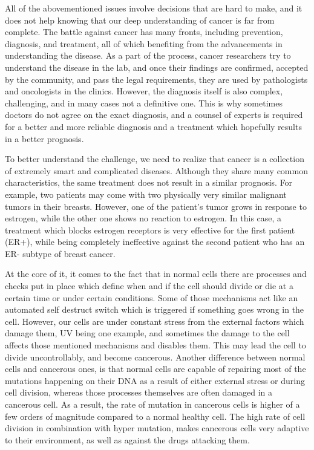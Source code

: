 All of the abovementioned issues involve decisions that are hard to make, and
it does not help knowing that our deep understanding of cancer is far from
complete. The battle against cancer has many fronts, including prevention,
diagnosis, and treatment, all of which benefiting from the advancements in
understanding the disease. As a part of the process, cancer researchers try to
understand the disease in the lab, and once their findings are confirmed,
accepted by the community, and pass the legal requirements, they are used by
pathologists and oncologists in the clinics. However, the diagnosis itself is
also complex, challenging, and in many cases not a definitive one. This is why
sometimes doctors do not agree on the exact diagnosis, and a counsel of experts
is required for a better and more reliable diagnosis and a treatment which
hopefully results in a better prognosis.

To better understand the challenge, we need to realize that cancer is a
collection of extremely smart and complicated diseases. Although they share
many common characteristics, the same treatment does not result in a similar
prognosis. For example, two patients may come with two physically very similar
malignant tumors in their breasts. However, one of the patient's tumor grows in
response to estrogen, while the other one shows no reaction to estrogen. In
this case, a treatment which blocks estrogen receptors is very effective for
the first patient (ER+), while being completely ineffective against the second
patient who has an ER- subtype of breast cancer.

At the core of it, it comes to the fact that in normal cells there are
processes and checks put in place which define when and if the cell should
divide or die at a certain time or under certain conditions. Some of those
mechanisms act like an automated self destruct switch which is triggered if
something goes wrong in the cell. However, our cells are under constant stress
from the external factors which damage them, UV being one example, and
sometimes the damage to the cell affects those mentioned mechanisms and
disables them. This may lead the cell to divide uncontrollably, and become
cancerous. Another difference between normal cells and cancerous ones, is that
normal cells are capable of repairing most of the mutations happening on their
DNA as a result of either external stress or during cell division, whereas
those processes themselves are often damaged in a cancerous cell. As a result,
the rate of mutation in cancerous cells is higher of a few orders of magnitude
compared to a normal healthy cell. The high rate of cell division in
combination with hyper mutation, makes cancerous cells very adaptive to their
environment, as well as against the drugs attacking them.

